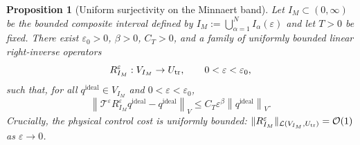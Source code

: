 \documentclass[11pt,a4paper]{article}
\numberwithin{equation}{section}
\newtheorem{proposition}[theorem]{Proposition}
\newcommand{\veps}{\varepsilon}
\newcommand{\eps}{\varepsilon}
\newcommand{\norm}[1]{\left\lVert #1 \right\rVert}
\begin{document}
\begin{proposition}[Uniform surjectivity on the Minnaert band]
\label{prop:surjectivity-IM}
Let $I_M\subset(0,\infty)$ be the bounded composite interval defined by $I_M := \bigcup_{\alpha=1}^N I_\alpha(\varepsilon)$ and let $T>0$ be fixed. There exist $\veps_0>0$, $\beta>0$, $C_T>0$, and a family of uniformly bounded linear right-inverse operators
\[
 R_{I_M}^\veps:V_{I_M}\to U_{\rm tr},\qquad 0<\veps<\veps_0,
\]
such that, for all $q^{\mathrm{ideal}}\in V_{I_M}$ and $0<\veps<\veps_0$,
\begin{equation}
\label{eq:approx-right-inverse-J}
 \norm{\mathcal{T}^\veps R_{I_M}^\veps q^{\mathrm{ideal}} - q^{\mathrm{ideal}}}_{V}
 \le C_T\veps^\beta\norm{q^{\mathrm{ideal}}}_V.
\end{equation}
Crucially, the physical control cost is uniformly bounded: $\|R_{I_M}^\eps\|_{\mathcal{L}(V_{I_M},U_{\rm tr})} = \mathcal{O}(1)$ as $\varepsilon \to 0$.
\end{proposition}
\end{document}
